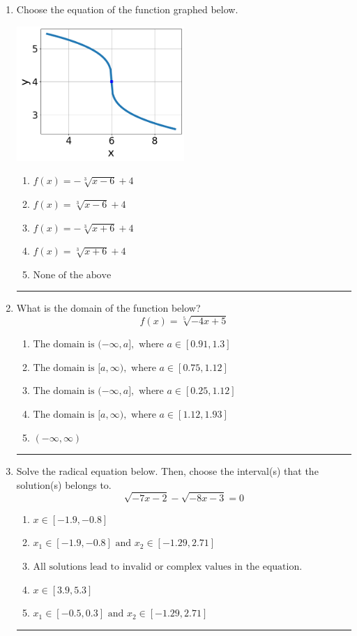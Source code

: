 \documentclass[14pt]{extbook}
\newcommand{\litem}[1]{\item#1\hspace*{-1cm}\rule{\textwidth}{0.4pt}}
\begin{document}
\begin{enumerate}
\litem{
Choose the equation of the function graphed below.
\begin{center}
    \includegraphics[width=0.5\textwidth]{../Figures/radicalGraphToEquationCopyB.png}
\end{center}
\begin{enumerate}[label=\Alph*.]
\item \( f(x) = - \sqrt[3]{x - 6} + 4 \)
\item \( f(x) = \sqrt[3]{x - 6} + 4 \)
\item \( f(x) = - \sqrt[3]{x + 6} + 4 \)
\item \( f(x) = \sqrt[3]{x + 6} + 4 \)
\item \( \text{None of the above} \)

\end{enumerate} }
\litem{
What is the domain of the function below?\[ f(x) = \sqrt[5]{-4 x + 5} \]\begin{enumerate}[label=\Alph*.]
\item \( \text{The domain is } (-\infty, a], \text{   where } a \in [0.91, 1.3] \)
\item \( \text{The domain is } [a, \infty), \text{   where } a \in [0.75, 1.12] \)
\item \( \text{The domain is } (-\infty, a], \text{   where } a \in [0.25, 1.12] \)
\item \( \text{The domain is } [a, \infty), \text{   where } a \in [1.12, 1.93] \)
\item \( (-\infty, \infty) \)

\end{enumerate} }
\litem{
Solve the radical equation below. Then, choose the interval(s) that the solution(s) belongs to.\[ \sqrt{-7 x - 2} - \sqrt{-8 x - 3} = 0 \]\begin{enumerate}[label=\Alph*.]
\item \( x \in [-1.9,-0.8] \)
\item \( x_1 \in [-1.9, -0.8] \text{ and } x_2 \in [-1.29,2.71] \)
\item \( \text{All solutions lead to invalid or complex values in the equation.} \)
\item \( x \in [3.9,5.3] \)
\item \( x_1 \in [-0.5, 0.3] \text{ and } x_2 \in [-1.29,2.71] \)


\end{enumerate}}
\end{enumerate}
\end{document}
